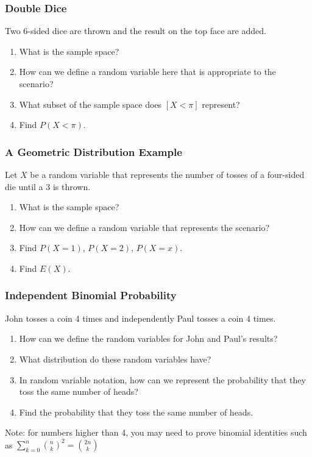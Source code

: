 \documentclass{beamer}
\begin{document}

\begin{frame}
  \frametitle{Double Dice}
  Two 6-sided dice are thrown and the result on the top face are added.
  \begin{enumerate}
    \item What is the sample space?
    \item How can we define a random variable here that is appropriate to the scenario?
    \item What subset of the sample space does $[X < \pi]$ represent?
    \item Find $P(X < \pi)$.
  \end{enumerate}
\end{frame}

\begin{frame}
  \frametitle{A Geometric Distribution Example}
  Let $X$ be a random variable that represents the number of tosses of a four-sided die until a 3 is thrown.
  \begin{enumerate}
    \item What is the sample space?
    \item How can we define a random variable that represents the scenario?
    \item Find $P(X = 1)$, $P(X=2)$, $P(X=x)$.
    \item Find $E(X)$.
  \end{enumerate}
\end{frame}

\begin{frame}
  \frametitle{Independent Binomial Probability}
  John tosses a coin 4 times and independently Paul tosses a coin 4 times.
  \begin{enumerate}
    \item How can we define the random variables for John and Paul's results?
    \item What distribution do these random variables have?
    \item In random variable notation, how can we represent the probability that they toss the same number of heads?
    \item Find the probability that they toss the same number of heads.
  \end{enumerate}
  Note: for numbers higher than 4, you may need to prove binomial identities such as $\sum_{k=0}^n \binom{n}{k}^2 = \binom{2n}{k}$
\end{frame}
\end{document}

